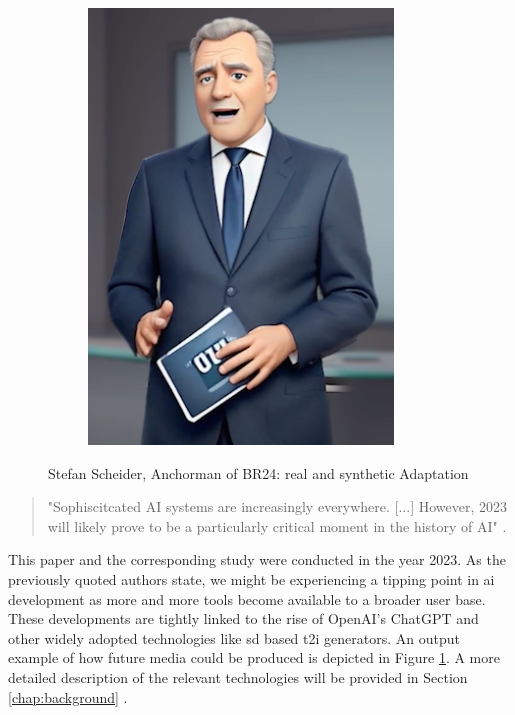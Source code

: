 \documentclass[
  a4paper,  %
  twoside,  %
  bibliography=totoc,
  headsepline,
  cleardoublepage=empty,
  parskip=half,
  draft=false
]{scrbook}
\begin{document}
\begin{figure}[h]
\begin{subfigure}[b]{0.4\textwidth}
    \includegraphics[width=\textwidth]{./graphics/scheider-sd.png}
  \end{subfigure}
  \caption{Stefan Scheider, Anchorman of BR24: real and synthetic Adaptation}
  \label{fig:scheider-real-sd}
\end{figure}
\begin{quotation}
"Sophiscitcated AI systems are increasingly everywhere. [...] However, 2023 will likely prove to be a particularly critical moment in the history of AI" \cite{arguedasAutomatingDemocracyGenerative2023}.
\end{quotation}
This paper and the corresponding study were conducted in the year 2023. As the previously quoted authors state, we might be experiencing a tipping point in \gls{ai} development as more and more tools become available to a broader user base. These developments are tightly linked to the rise of OpenAI's ChatGPT and other widely adopted technologies like \gls{sd} based \gls{t2i} generators. An output example of how future media could be produced is depicted in Figure \ref{fig:scheider-real-sd}. A more detailed description of the relevant technologies will be provided in Section \ref{chap:background} . \\
\end{document}
